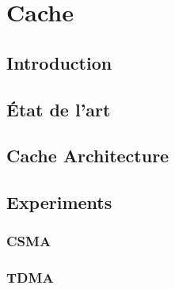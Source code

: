
\chapter{Cache} %
\label{cha:cache}

\minitoc

\lipsum

\section{Introduction} %
\label{sec:cache_introduction}

\lipsum


\section{État de l'art} %
\label{sec:_tat_de_l_art}

\lipsum



\section{Cache Architecture} %
\label{sec:cache_architecture}

\lipsum


\section{Experiments} %
\label{sec:cache_experiments}

\lipsum

\subsection{CSMA} %
\label{sub:csma}

\lipsum


\subsection{TDMA} %
\label{sub:tdma}

\lipsum



